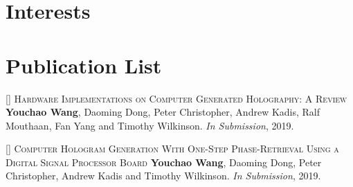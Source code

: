 \documentclass[11pt,a4paper]{moderncv}
\begin{document}
\vspace*{-0.2cm}

\vspace*{-0.2cm}

\vspace*{-0.6cm}

\section{Interests}

\vspace*{-0.2cm}

\section{Publication List}
\setcounter{counter}{1}

\textsc{[] Hardware Implementations on Computer Generated Holography: A Review}
\newline  \textbf{Youchao Wang}, Daoming Dong, Peter Christopher, Andrew Kadis, Ralf Mouthaan, Fan Yang and Timothy Wilkinson. \textit{In Submission}, 2019.


\addtocounter{counter}{1}

\textsc{[] Computer Hologram Generation With One-Step Phase-Retrieval Using a Digital Signal Processor Board}
\newline  \textbf{Youchao Wang}, Daoming Dong, Peter Christopher, Andrew Kadis and Timothy Wilkinson. \textit{In Submission}, 2019.
\end{document}
